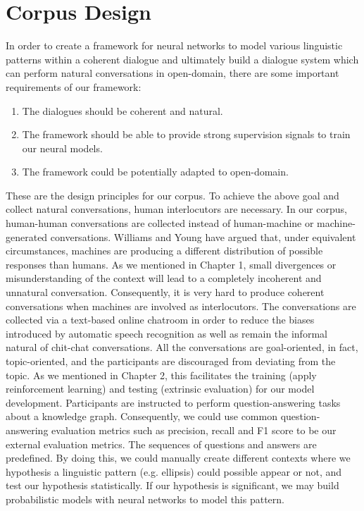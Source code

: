\documentclass[bsc,frontabs,twoside,singlespacing,parskip,deptreport]{infthesis}     %
\begin{document}
\section{Corpus Design}

In order to create a framework for neural networks to model various linguistic patterns within a coherent dialogue and ultimately build a dialogue system which can perform natural conversations in open-domain, there are some important requirements of our framework:

\begin{enumerate}
   \item The dialogues should be coherent and natural.
   
   \item The framework should be able to provide strong supervision signals to train our neural models. 
 
   \item The framework could be potentially adapted to open-domain.
\end{enumerate}

These are the design principles for our corpus. To achieve the above goal and collect natural conversations, human interlocutors are necessary. In our corpus, human-human conversations are collected instead of human-machine or machine-generated conversations. Williams and Young \cite{williams2007partially} have argued that, under equivalent circumstances, machines are producing a different distribution of possible responses than humans. As we mentioned in Chapter 1, small divergences or misunderstanding of the context will lead to a completely incoherent and unnatural conversation. Consequently, it is very hard to produce coherent conversations when machines are involved as interlocutors. The conversations are collected via a text-based online chatroom in order to reduce the biases introduced by automatic speech recognition \cite{williams2007partially} as well as remain the informal natural of chit-chat conversations. All the conversations are goal-oriented, in fact, topic-oriented, and the participants are discouraged from deviating from the topic. As we mentioned in Chapter 2, this facilitates the training (apply reinforcement learning) and testing (extrinsic evaluation) for our model development. Participants are instructed to perform question-answering tasks about a knowledge graph. Consequently, we could use common question-answering evaluation metrics such as precision, recall and F1 score to be our external evaluation metrics. The sequences of questions and answers are predefined. By doing this, we could manually create different contexts where we hypothesis a linguistic pattern (e.g. ellipsis) could possible appear or not, and test our hypothesis statistically. If our hypothesis is significant, we may build probabilistic models with neural networks to model this pattern.
\end{document}
